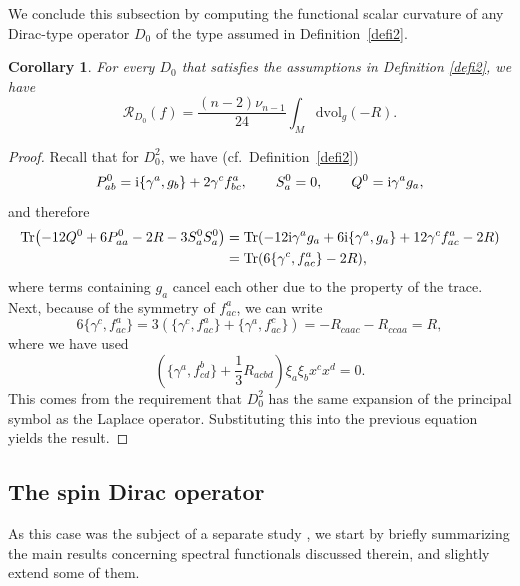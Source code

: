 \documentclass[pdftex]{sigma}
\numberwithin{equation}{section}
\newtheorem{Corollary}[Theorem]{Corollary}
\theoremstyle{definition}
\def\Tr{\mathrm{Tr}}
\def\dv{\mathrm{dvol}_g}
\begin{document}
	We conclude this subsection by computing the functional scalar curvature of any Dirac-type operator $D_0$ of the type assumed in Definition~\ref{defi2}.
	\begin{Corollary}
		For every $D_0$ that satisfies the assumptions in Definition {\rm\ref{defi2}}, we have
		\[ \mathscr{R}_{D_0}(f) = \frac{(n-2)\nu_{n-1}}{24}\int_M \dv (-R). \]
	\end{Corollary}
	
	\begin{proof}
		Recall that for $D^2_0$, we have (cf.\ Definition~\ref{defi2})
		\[
			P^0_{ab}={\rm i}\{\gamma^a,g_b\}+2\gamma^cf^a_{bc},
			\qquad S_a^0=0,\qquad Q^0={\rm i}\gamma^ag_a,
		\]
		and therefore
		\begin{align*}
			\Tr\bigl(-12Q^0+6P^0_{aa}-2R-3S^0_aS^0_a\bigr)&=
			\Tr(-12{\rm i}\gamma^ag_a+6{\rm i}\{\gamma^a,g_a\}+12\gamma^cf^a_{ac}-2R)\\
			&=\Tr(6\{\gamma^c,f^a_{ac}\}-2R),
		\end{align*}
		where terms containing $g_a$ cancel each other due to the property of the trace. Next, because of the symmetry of $f^a_{ac}$, we can write
		\[
		6\{\gamma^c,f^a_{ac}\}=3(\{\gamma^c,f^a_{ac}\}+\{\gamma^a,f^c_{ac}\})=-R_{caac}-R_{ccaa}=R,
		\]
		where we have used
		\[
			\left(\bigl\{\gamma^a,f^b_{cd}\bigr\}+\frac13 R_{acbd} \right)\xi_a\xi_b x^c x^d=0.
		\]
		This comes from the requirement that $D_0^2$ has the same expansion of the principal symbol as the Laplace operator.
		Substituting this into the previous equation yields the result.
	\end{proof}
	
\subsection{The spin Dirac operator}
As this case was the subject of a separate study \cite{bochniak2025}, we start by briefly summarizing
the main results concerning spectral functionals discussed therein, and slightly extend some of them.
\end{document}

